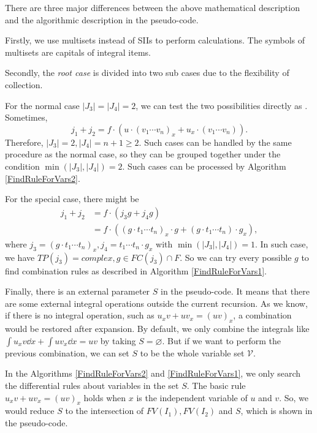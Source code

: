 There are three major differences between the above mathematical description and the algorithmic description in the pseudo-code. 

Firstly, we use multisets instead of SIIs to perform calculations. The symbols of multisets are capitals of integral items. 

Secondly, the \emph{root case} is divided into two sub cases due to the flexibility of collection. 

For the normal case $|J_3|=|J_4|=2$, we can test the two possibilities directly as  . Sometimes, 
\begin{equation}
j_1+j_2 = f \cdot ( u \cdot (v_1 \cdots v_n)_x +  u_x \cdot (v_1 \cdots v_n ) ).
\end{equation}
Therefore, $|J_3|=2,|J_4|=n+1\ge 2$. Such cases can be handled by the same procedure as the normal case, so they can be grouped together under the condition $\min(|J_3|,|J_4|)=2$. Such cases can be processed by Algorithm \ref{FindRuleForVars2}.

For the special case, there might be 
\begin{equation}
\begin{split}
j_1 + j_2   &= f \cdot ( j_3 g + j_4 g ) \\ 
            &= f \cdot ( (g \cdot t_1\cdots t_n)_x\cdot g + (g \cdot t_1\cdots t_n)\cdot g_x ),
\end{split}
\end{equation}
where $j_3=(g \cdot t_1\cdots t_n)_x , j_4=t_1\cdots t_n\cdot g_x$ with $\min(|J_3|,|J_4|)=1$. In such case, we have $TP(j_3)=complex, g\in FC(j_3)\cap F$. So we can try every possible $g$ to find combination rules as described in Algorithm \ref{FindRuleForVars1}. 

Finally, there is an external parameter $S$ in the pseudo-code. It means that there are some external integral operations outside the current recursion. As we know, if there is no integral operation, such as $u_x v + u v_x = (uv)_x$, a combination would be restored after expansion. By default, we only combine the integrals like $\int\!{u_x v\dd x} + \int\!{u v_x\dd x} = uv$ by taking $S=\varnothing$. But if we want to perform the previous combination, we can set $S$ to be the whole variable set $\mathcal V$. 

In the Algorithms \ref{FindRuleForVars2} and \ref{FindRuleForVars1}, we only search the differential rules about variables in the set $S$.  The basic rule $u_x v + u v_x = (uv)_x$ holds when $x$ is the independent variable of $u$ and $v$. So, we would reduce $S$ to the intersection of $FV(I_1),FV(I_2)$ and $S$, which is shown in the pseudo-code.

